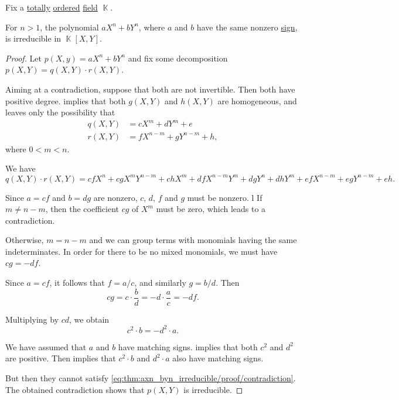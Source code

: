 \begin{proposition}\label{thm:axn_byn_irreducible}
  Fix a \hyperref[def:totally_ordered_set]{totally} \hyperref[def:ordered_semiring]{ordered} \hyperref[def:field]{field} \( \BbbK \).

  For \( n > 1 \), the polynomial \( a X^n + b Y^n \), where \( a \) and \( b \) have the same nonzero \hyperref[def:signum]{sign}, is irreducible in \( \BbbK[X, Y] \).
\end{proposition}
\begin{proof}
  Let \( p(X, y) = a X^n + b Y^n \) and fix some decomposition \( p(X, Y) = q(X, Y) \cdot r(X, Y) \).

  Aiming at a contradiction, suppose that both are not invertible. Then both have positive degree.  implies that both \( g(X, Y) \) and \( h(X, Y) \) are homogeneous, and  leaves only the possibility that
  \begin{align*}
    q(X, Y) &= c X^m + d Y^m + e \\
    r(X, Y) &= f X^{n-m} + g Y^{n-m} + h,
  \end{align*}
  where \( 0 < m < n \).

  We have
  \begin{equation*}
    q(X, Y) \cdot r(X, Y) = c f X^n + c g X^m Y^{n-m} + c h X^m + d f X^{n-m} Y^m + d g Y^n + d h Y^m + e f X^{n-m} + e g Y^{n-m} + e h.
  \end{equation*}

  Since \( a = c f \) and \( b = d g \) are nonzero, \( c \), \( d \), \( f \) and \( g \) must be nonzero.
l
  If \( m \neq n - m \), then the coefficient \( c g \) of \( X^m \) must be zero, which leads to a contradiction.

  Otherwise, \( m = n - m \) and we can group terms with monomials having the same indeterminates. In order for there to be no mixed monomials, we must have \( c g = - d f \).

  Since \( a = c f \), it follows that \( f = a / c \), and similarly \( g = b / d \). Then
  \begin{equation*}
    c g = c \cdot \frac b d = - d \cdot \frac a c = - d f.
  \end{equation*}

  Multiplying by \( cd \), we obtain
  \begin{equation}\label{eq:thm:axn_byn_irreducible/proof/contradiction}
    c^2 \cdot b = - d^2 \cdot a.
  \end{equation}

  We have assumed that \( a \) and \( b \) have matching signs.  implies that both \( c^2 \) and \( d^2 \) are positive. Then  implies that \( c^2 \cdot b \) and \( d^2 \cdot a \) also have matching signs.

  But then they cannot satisfy \eqref{eq:thm:axn_byn_irreducible/proof/contradiction}. The obtained contradiction shows that \( p(X, Y) \) is irreducible.
\end{proof}

